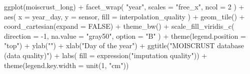 \documentclass[
  table]{article}
\newenvironment{Shaded}{\begin{snugshade}}{\end{snugshade}}
\newcommand{\AttributeTok}[1]{\textcolor[rgb]{0.77,0.63,0.00}{#1}}
\newcommand{\ConstantTok}[1]{\textcolor[rgb]{0.00,0.00,0.00}{#1}}
\newcommand{\DecValTok}[1]{\textcolor[rgb]{0.00,0.00,0.81}{#1}}
\newcommand{\FunctionTok}[1]{\textcolor[rgb]{0.00,0.00,0.00}{#1}}
\newcommand{\NormalTok}[1]{#1}
\newcommand{\SpecialCharTok}[1]{\textcolor[rgb]{0.00,0.00,0.00}{#1}}
\newcommand{\StringTok}[1]{\textcolor[rgb]{0.31,0.60,0.02}{#1}}
\begin{document}
\begin{Shaded}
\begin{Highlighting}[]
\FunctionTok{ggplot}\NormalTok{(moiscrust\_long) }\SpecialCharTok{+} 
  \FunctionTok{facet\_wrap}\NormalTok{(}
    \StringTok{"year"}\NormalTok{, }
    \AttributeTok{scales =} \StringTok{"free\_x"}\NormalTok{, }
    \AttributeTok{ncol =} \DecValTok{2}
\NormalTok{    ) }\SpecialCharTok{+}
  \FunctionTok{aes}\NormalTok{(}
    \AttributeTok{x =}\NormalTok{ year\_day, }
    \AttributeTok{y =}\NormalTok{ sensor, }
    \AttributeTok{fill =}\NormalTok{ interpolation\_quality}
\NormalTok{    ) }\SpecialCharTok{+} 
  \FunctionTok{geom\_tile}\NormalTok{() }\SpecialCharTok{+} 
  \FunctionTok{coord\_cartesian}\NormalTok{(}\AttributeTok{expand =} \ConstantTok{FALSE}\NormalTok{) }\SpecialCharTok{+}
  \FunctionTok{theme\_bw}\NormalTok{() }\SpecialCharTok{+} 
  \FunctionTok{scale\_fill\_viridis\_c}\NormalTok{(}
    \AttributeTok{direction =} \SpecialCharTok{{-}}\DecValTok{1}\NormalTok{, }
    \AttributeTok{na.value =} \StringTok{"gray50"}\NormalTok{, }
    \AttributeTok{option =} \StringTok{"B"}
\NormalTok{    ) }\SpecialCharTok{+}
  \FunctionTok{theme}\NormalTok{(}\AttributeTok{legend.position =} \StringTok{"top"}\NormalTok{) }\SpecialCharTok{+} 
  \FunctionTok{ylab}\NormalTok{(}\StringTok{""}\NormalTok{) }\SpecialCharTok{+} 
  \FunctionTok{xlab}\NormalTok{(}\StringTok{"Day of the year"}\NormalTok{) }\SpecialCharTok{+}
  \FunctionTok{ggtitle}\NormalTok{(}\StringTok{"MOISCRUST database (data quality)"}\NormalTok{) }\SpecialCharTok{+}
  \FunctionTok{labs}\NormalTok{(}
    \AttributeTok{fill =} \FunctionTok{expression}\NormalTok{(}\StringTok{"imputation quality"}\NormalTok{)) }\SpecialCharTok{+} 
  \FunctionTok{theme}\NormalTok{(}\AttributeTok{legend.key.width =} \FunctionTok{unit}\NormalTok{(}\DecValTok{1}\NormalTok{, }\StringTok{"cm"}\NormalTok{))}
\end{Highlighting}
\end{Shaded}
\end{document}
